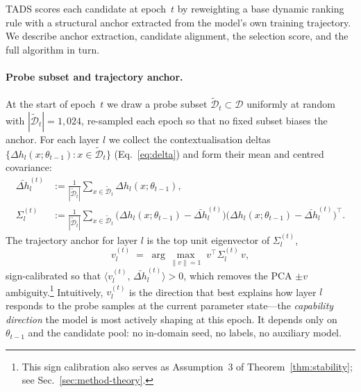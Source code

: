 \textsc{TADS} scores each candidate at epoch~$t$ by reweighting a
base dynamic ranking rule with a structural anchor extracted from
the model's own training trajectory. We describe anchor extraction,
candidate alignment, the selection score, and the full algorithm in
turn.

\paragraph{Probe subset and trajectory anchor.}
At the start of epoch~$t$ we draw a probe subset
$\widetilde{\mathcal{D}}_t \subset \mathcal{D}$ uniformly at random
with $|\widetilde{\mathcal{D}}_t| = 1{,}024$, re-sampled each epoch
so that no fixed subset biases the anchor. For each layer $l$ we
collect the contextualisation deltas
$\{\Delta h_l(x;\theta_{t-1}) : x \in \widetilde{\mathcal{D}}_t\}$
(Eq.~\ref{eq:delta}) and form their mean and centred covariance:
\begin{align}
  \bar{\Delta h}_l^{(t)}
   &:= \frac{1}{|\widetilde{\mathcal{D}}_t|}
      \sum_{x \in \widetilde{\mathcal{D}}_t} \Delta h_l(x;\theta_{t-1}),
   \label{eq:mu} \\[2pt]
  \Sigma_l^{(t)}
   &:= \frac{1}{|\widetilde{\mathcal{D}}_t|}
      \sum_{x \in \widetilde{\mathcal{D}}_t}
      \bigl(\Delta h_l(x;\theta_{t-1}) - \bar{\Delta h}_l^{(t)}\bigr)
      \bigl(\Delta h_l(x;\theta_{t-1}) - \bar{\Delta h}_l^{(t)}\bigr)^{\!\top}.
   \label{eq:sigma}
\end{align}
The trajectory anchor for layer $l$ is the top unit eigenvector of
$\Sigma_l^{(t)}$,
\begin{equation}
  v_l^{(t)} \;=\;
  \arg\max_{\|v\| = 1}\; v^{\!\top} \Sigma_l^{(t)}\, v,
  \label{eq:anchor-def}
\end{equation}
sign-calibrated so that
$\langle v_l^{(t)},\, \bar{\Delta h}_l^{(t)} \rangle > 0$, which
removes the PCA $\pm v$ ambiguity.\footnote{This sign calibration
also serves as Assumption~3 of Theorem~\ref{thm:stability}; see
Sec.~\ref{sec:method-theory}.} Intuitively, $v_l^{(t)}$ is the
direction that best explains how layer $l$ responds to the probe
samples at the current parameter state---the \emph{capability
direction} the model is most actively shaping at this epoch. It
depends only on $\theta_{t-1}$ and the candidate pool: no in-domain
seed, no labels, no auxiliary model.


